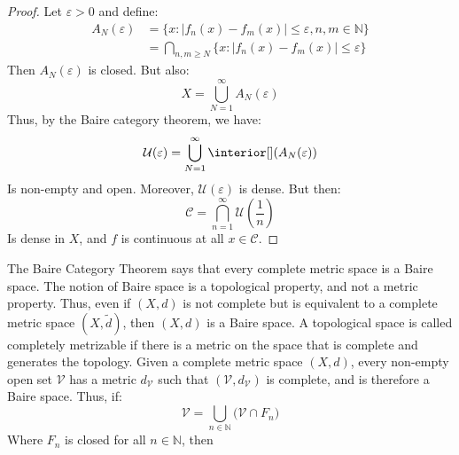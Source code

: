             \begin{proof}
            Let $\varepsilon>0$ and define:
            \begin{align}
                A_{N}(\varepsilon)&=
                \{x:|f_{n}(x)-f_{m}(x)|\leq\varepsilon,
                    n,m\in\mathbb{N}\}\\
                &=\bigcap_{n,m\geq{N}}
                    \{x:|f_{n}(x)-f_{m}(x)|\leq\varepsilon\}
            \end{align}
            Then $A_{N}(\varepsilon)$ is closed. But also:
            \begin{equation}
                X=\bigcup_{N=1}^{\infty}A_{N}(\varepsilon)
            \end{equation}
            Thus, by the Baire category theorem, we have:
            \begin{equation}
                \mathcal{U}(\varepsilon)=
                \bigcup_{N=1}^{\infty}\interior[](A_{N}(\varepsilon))
            \end{equation}
            Is non-empty and open. Moreover,
            $\mathcal{U}(\varepsilon)$ is dense. But then:
            \begin{equation}
                \mathcal{C}=\bigcap_{n=1}^{\infty}
                \mathcal{U}(\frac{1}{n})
            \end{equation}
            Is dense in $X$, and $f$ is continuous at all
            $x\in\mathcal{C}$.
        \end{proof}
            The Baire Category Theorem says that every complete metric
            space is a Baire space. The notion of Baire space is a
            topological property, and not a metric property. Thus, even
            if $(X,d)$ is not complete but is equivalent to a complete
            metric space $(X,\tilde{d})$, then $(X,d)$ is a Baire space.
            A topological space is called completely metrizable if there
            is a metric on the space that is complete and generates the
            topology. Given a complete metric space $(X,d)$, every
            non-empty open set $\mathcal{V}$ has a metric
            $d_{\mathcal{V}}$ such that $(\mathcal{V},d_{\mathcal{V}})$
            is complete, and is therefore a Baire space. Thus, if:
            \begin{equation}
                \mathcal{V}=\bigcup_{n\in\mathbb{N}}\Big(
                    \mathcal{V}\cap{F}_{n}\Big)
            \end{equation}
            Where $F_{n}$ is closed for all $n\in\mathbb{N}$, then
